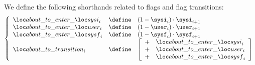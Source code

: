 We define the following shorthands related to flags and flag transitions:
\[
	\left\{ \begin{array}{lcl}
		\aboutToEnterSystemInit       _{i} & \define & (1 - \sysi _{i}) \cdot \sysi _{i + 1} \\
		\aboutToEnterUserTransactions _{i} & \define & (1 - \user _{i}) \cdot \user _{i + 1} \\
		\aboutToEnterSystemFinl       _{i} & \define & (1 - \sysf _{i}) \cdot \sysf _{i + 1} \\
		\aboutToTransition _{i} & \define &
		\left[ \begin{array}{cl}
			+ & \aboutToEnterSystemInit       _{i} \\
			+ & \aboutToEnterUserTransactions _{i} \\
			+ & \aboutToEnterSystemFinl       _{i} \\
		\end{array} \right]
	\end{array} \right.
\]
